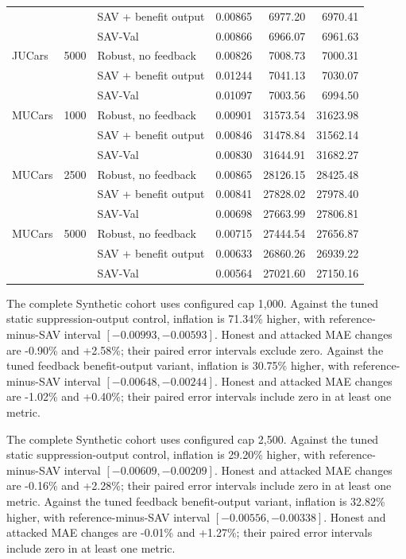 \begin{table}[t]
\begin{tabular}{lrlrrr}
 &  & SAV + benefit output & 0.00865 & 6977.20 & 6970.41\\
 &  & SAV-Val & 0.00866 & 6966.07 & 6961.63\\
\midrule
JUCars & 5000 & Robust, no feedback & 0.00826 & 7008.73 & 7000.31\\
 &  & SAV + benefit output & 0.01244 & 7041.13 & 7030.07\\
 &  & SAV-Val & 0.01097 & 7003.56 & 6994.50\\
\midrule
MUCars & 1000 & Robust, no feedback & 0.00901 & 31573.54 & 31623.98\\
 &  & SAV + benefit output & 0.00846 & 31478.84 & 31562.14\\
 &  & SAV-Val & 0.00830 & 31644.91 & 31682.27\\
\midrule
MUCars & 2500 & Robust, no feedback & 0.00865 & 28126.15 & 28425.48\\
 &  & SAV + benefit output & 0.00841 & 27828.02 & 27978.40\\
 &  & SAV-Val & 0.00698 & 27663.99 & 27806.81\\
\midrule
MUCars & 5000 & Robust, no feedback & 0.00715 & 27444.54 & 27656.87\\
 &  & SAV + benefit output & 0.00633 & 26860.26 & 26939.22\\
 &  & SAV-Val & 0.00564 & 27021.60 & 27150.16\\
\bottomrule
\end{tabular}
\end{table}

The complete Synthetic cohort uses configured cap 1,000. Against the tuned static suppression-output control, inflation is 71.34\% higher, with reference-minus-SAV interval $[-0.00993,-0.00593]$. Honest and attacked MAE changes are -0.90\% and +2.58\%; their paired error intervals exclude zero. Against the tuned feedback benefit-output variant, inflation is 30.75\% higher, with reference-minus-SAV interval $[-0.00648,-0.00244]$. Honest and attacked MAE changes are -1.02\% and +0.40\%; their paired error intervals include zero in at least one metric.

The complete Synthetic cohort uses configured cap 2,500. Against the tuned static suppression-output control, inflation is 29.20\% higher, with reference-minus-SAV interval $[-0.00609,-0.00209]$. Honest and attacked MAE changes are -0.16\% and +2.28\%; their paired error intervals include zero in at least one metric. Against the tuned feedback benefit-output variant, inflation is 32.82\% higher, with reference-minus-SAV interval $[-0.00556,-0.00338]$. Honest and attacked MAE changes are -0.01\% and +1.27\%; their paired error intervals include zero in at least one metric.

